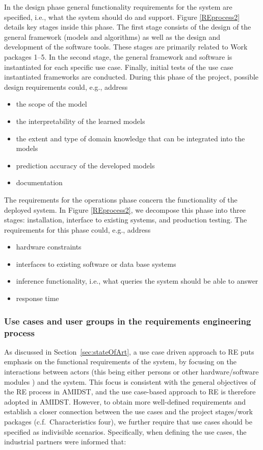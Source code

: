 In the design phase  general functionality requirements for the system are specified, i.e., what the system should do and 
support.
Figure \ref{REprocess2} details key stages inside this phase. The first stage consists of the design of the general
framework (models and algorithms) as well as the design and development of the software tools. These stages are 
primarily
related to Work packages 1--5. In the second stage, the general framework and software is instantiated for each specific
use case. Finally, initial tests of the use case instantiated frameworks are conducted.  During this phase of the project, 
possible design requirements could, e.g., address
\begin{itemize}
 \item the scope of the model
 \item the interpretability of the learned models
 \item the extent and type of domain knowledge that can be integrated into the models
 \item prediction accuracy of the developed models
 \item documentation
\end{itemize}

The requirements for the operations phase concern the functionality of the deployed system. In Figure \ref{REprocess2}, 
we decompose this phase into three stages: installation, interface to existing systems, and production testing. The 
requirements for this phase could, e.g., address
\begin{itemize}
 \item hardware constraints
 \item interfaces to existing software or data base systems
 \item inference functionality, i.e., what queries the system should be able to answer
 \item response time
\end{itemize}


\subsubsection{Use cases and user groups in the requirements engineering process}

As discussed in Section~\ref{sec:stateOfArt}, a use case driven approach to RE puts emphasis on
the functional requirements of the system, by focusing on the
interactions between actors (this being either persons or other hardware/software modules ) and the system. This focus
is consistent with the general objectives of the RE process in AMIDST, and the use case-based
approach to RE is therefore adopted in AMIDST. However, to obtain more well-defined
requirements and establish a closer connection
between the use cases and the project stages/work packages (c.f.\ Characteristics four), we further require that use
cases should be specified as indivisible scenarios. Specifically, when defining the use cases, 
the industrial partners were informed that:

